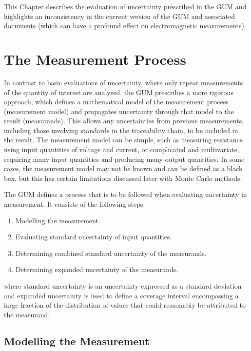 \documentclass[../thesis/thesis.tex]{subfiles}
\begin{document}
This Chapter describes the evaluation of uncertainty prescribed in the GUM and highlights an inconsistency in the current version of the GUM and associated documents (which can have a profound effect on electromagnetic measurements).

\section{The Measurement Process}

In contrast to basic evaluations of uncertainty, where only repeat measurements of the quantity of interest are analysed, the GUM prescribes a more rigorous approach, which defines a mathematical model of the measurement process (measurement model) and propagates uncertainty through that model to the result (measurands). This allows any uncertainties from previous measurements, including those involving standards in the traceability chain, to be included in the result. The measurement model can be simple, such as measuring resistance using input quantities of voltage and current, or complicated and multivariate, requiring many input quantities and producing many output quantities. In some cases, the measurement model may not be known and can be defined as a black box, but this has certain limitations discussed later with Monte Carlo methods.

The GUM defines a process that is to be followed when evaluating uncertainty in measurement. It consists of the following steps:

\begin{enumerate}
	\item Modelling the measurement.
	\item Evaluating standard uncertainty of input quantities.
	\item Determining combined standard uncertainty of the measurands.
	\item Determining expanded uncertainty of the measurands.
\end{enumerate}

where standard uncertainty is an uncertainty expressed as a standard deviation and expanded uncertainty is used to define a coverage interval encompassing a large fraction of the distribution of values that could reasonably be attributed to the measurand.

\subsection{Modelling the Measurement}
\end{document}
